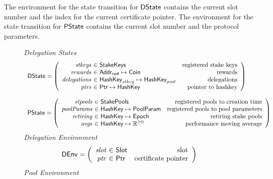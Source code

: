 The environment for the state transition for $\mathsf{DState}$ contains the current slot number
and the index for the current certificate pointer.
The environment for the state transition for $\mathsf{PState}$ contains the current slot number
and the protocol parameters.

\begin{figure}
  \emph{Delegation States}
  \begin{equation*}
    \begin{array}{l}
    \DState =
    \left(\begin{array}{r@{~\in~}lr}
      \var{stkeys} & \StakeKeys & \text{registered stake keys}\\
      \var{rewards} & \AddrRWD \mapsto \Coin & \text{rewards}\\
      \var{delegations} & \HashKey_{stkey} \mapsto \HashKey_{pool} & \text{delegations}\\
      \var{ptrs} & \Ptr \mapsto \HashKey & \text{pointer to hashkey}\\
    \end{array}\right)
    \\
    \\
    \PState =
    \left(\begin{array}{r@{~\in~}lr}
      \var{stpools} & \StakePools & \text{registered pools to creation time}\\
      \var{poolParams} & \HashKey \mapsto \PoolParam
        & \text{registered pools to pool parameters}\\
      \var{retiring} & \HashKey \mapsto \Epoch & \text{retiring stake pools}\\
      \var{avgs} & \HashKey \mapsto \Rnn & \text{performance moving average}\\
    \end{array}\right)
    \end{array}
  \end{equation*}
  \emph{Delegation Environment}
  \begin{equation*}
    \DEnv =
    \left(
      \begin{array}{r@{~\in~}lr}
        \var{slot} & \Slot & \text{slot}\\
        \var{ptr} & \Ptr & \text{certificate pointer}\\
      \end{array}
    \right)
  \end{equation*}
  \emph{Pool Environment}
  \begin{equation*}

\end{equation*}
\end{figure}
